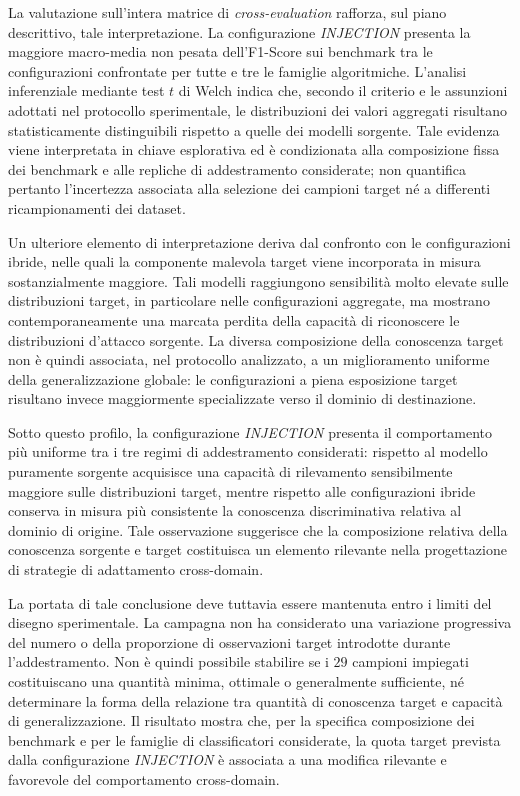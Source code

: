 La valutazione sull'intera matrice di \textit{cross-evaluation} rafforza, sul piano descrittivo, tale interpretazione.
La configurazione \textit{INJECTION} presenta la maggiore macro-media non pesata dell'F1-Score sui benchmark tra le configurazioni confrontate per tutte e tre le famiglie algoritmiche.
L'analisi inferenziale mediante test $t$ di Welch indica che, secondo il criterio e le assunzioni adottati nel protocollo sperimentale, le distribuzioni dei valori aggregati risultano statisticamente distinguibili rispetto a quelle dei modelli sorgente.
Tale evidenza viene interpretata in chiave esplorativa ed è condizionata alla composizione fissa dei benchmark e alle repliche di addestramento considerate; non quantifica pertanto l'incertezza associata alla selezione dei campioni target né a differenti ricampionamenti dei dataset.

Un ulteriore elemento di interpretazione deriva dal confronto con le configurazioni ibride, nelle quali la componente malevola target viene incorporata in misura sostanzialmente maggiore.
Tali modelli raggiungono sensibilità molto elevate sulle distribuzioni target, in particolare nelle configurazioni aggregate, ma mostrano contemporaneamente una marcata perdita della capacità di riconoscere le distribuzioni d'attacco sorgente.
La diversa composizione della conoscenza target non è quindi associata, nel protocollo analizzato, a un miglioramento uniforme della generalizzazione globale: le configurazioni a piena esposizione target risultano invece maggiormente specializzate verso il dominio di destinazione.

Sotto questo profilo, la configurazione \textit{INJECTION} presenta il comportamento più uniforme tra i tre regimi di addestramento considerati: rispetto al modello puramente sorgente acquisisce una capacità di rilevamento sensibilmente maggiore sulle distribuzioni target, mentre rispetto alle configurazioni ibride conserva in misura più consistente la conoscenza discriminativa relativa al dominio di origine.
Tale osservazione suggerisce che la composizione relativa della conoscenza sorgente e target costituisca un elemento rilevante nella progettazione di strategie di adattamento cross-domain.

La portata di tale conclusione deve tuttavia essere mantenuta entro i limiti del disegno sperimentale.
La campagna non ha considerato una variazione progressiva del numero o della proporzione di osservazioni target introdotte durante l'addestramento.
Non è quindi possibile stabilire se i $29$ campioni impiegati costituiscano una quantità minima, ottimale o generalmente sufficiente, né determinare la forma della relazione tra quantità di conoscenza target e capacità di generalizzazione.
Il risultato mostra che, per la specifica composizione dei benchmark e per le famiglie di classificatori considerate, la quota target prevista dalla configurazione \textit{INJECTION} è associata a una modifica rilevante e favorevole del comportamento cross-domain.

